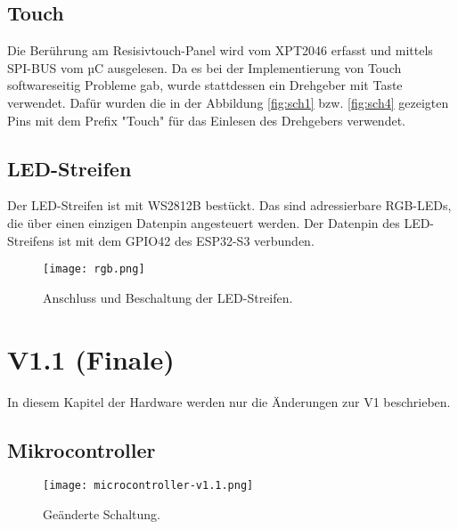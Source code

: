         

        \newpage
        \subsection{Touch}
        Die Berührung am Resisivtouch-Panel wird vom XPT2046 erfasst und mittels 
        SPI-BUS vom µC ausgelesen. Da es bei der Implementierung von Touch softwareseitig
        Probleme gab, wurde stattdessen ein Drehgeber mit Taste verwendet.
        Dafür wurden die in der Abbildung \ref{fig:sch1} bzw. \ref{fig:sch4} gezeigten Pins mit 
        dem Prefix "Touch" für das Einlesen des Drehgebers verwendet.

        \subsection{LED-Streifen}

        Der LED-Streifen ist mit WS2812B bestückt. Das sind adressierbare RGB-LEDs, 
        die über einen einzigen Datenpin angesteuert werden. 
        Der Datenpin des LED-Streifens ist mit dem GPIO42 des ESP32-S3 verbunden. 

            \begin{figure}[h!]
                \centering
                \texttt{[image: rgb.png]}
                \caption{Anschluss und Beschaltung der LED-Streifen.}
                \label{fig:led_strip}
            \end{figure}




 
    \newpage
    \section{V1.1 (Finale)}       
    In diesem Kapitel der Hardware werden nur die Änderungen zur V1 beschrieben. 

        \subsection{Mikrocontroller}
        

            \begin{figure}[h!]
                \centering
                \texttt{[image: microcontroller-v1.1.png]}
                \caption{Geänderte Schaltung.}
                \label{fig:sch5}

            \end{figure}

